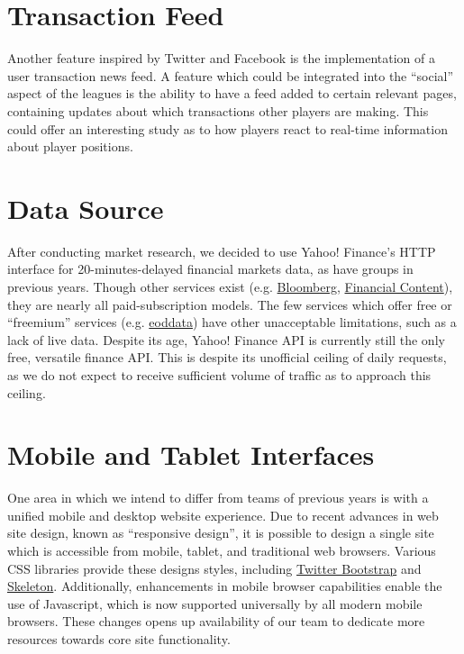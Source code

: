 \documentclass[11pt,letterpaper,oneside]{memoir}
\begin{document}
\section{Transaction Feed}

Another feature inspired by Twitter and Facebook is the implementation of a user transaction
news feed. A feature which could be integrated into the ``social'' aspect of the leagues
is the ability to have a feed added to certain relevant pages, containing updates about 
which transactions other players are making. This could offer an interesting study as to how
players react to real-time information about player positions.

\section{Data Source}

After conducting market research, we decided to use Yahoo! Finance's HTTP 
interface for 20-minutes-delayed financial markets data, as have groups in 
previous years. Though other services
exist (e.g. 
\href{http://www.bloomberg.com/enterprise/enterprise_products/data_optimization/data_feeds/}{Bloomberg},
\href{http://www.financialcontent.com}{Financial Content}), they are nearly all paid-subscription models. 
The few services which offer free or ``freemium'' services (e.g. 
\href{http://eoddata.com}{eoddata}) have other unacceptable limitations, such as a 
lack of live data. Despite its age, Yahoo! Finance API is currently still the only 
free, versatile finance API. This is despite its unofficial ceiling of daily requests,
as we do not expect to receive sufficient volume of traffic as to approach this ceiling.

\section{Mobile and Tablet Interfaces}

One area in which we intend to differ from teams of previous years is with a unified
mobile and desktop website experience. Due to recent advances in web site design, 
known as ``responsive design'', it is possible to design a single site which is accessible 
from mobile, tablet, and traditional web browsers. Various CSS libraries provide
these designs styles, including
\href{http://twitter.github.com/bootstrap/}{Twitter Bootstrap}
and
\href{http://getskeleton.com}{Skeleton}.
Additionally, enhancements in mobile 
browser capabilities enable the use of Javascript, which is now supported universally
by all modern mobile browsers. These changes opens up availability of our team to dedicate 
more resources towards core site functionality.
\end{document}
